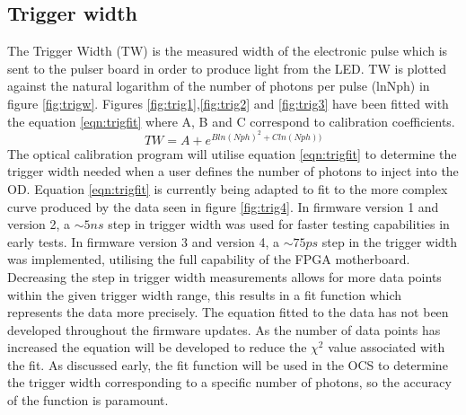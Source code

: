 \subsection{Trigger width}\label{subsec:trigw}
The Trigger Width (TW) is the measured width of the electronic pulse which is sent to the pulser board in order to produce light from the LED. TW is plotted against the natural logarithm of the number of photons per pulse (lnNph) in figure \ref{fig:trigw}. Figures \ref{fig:trig1},\ref{fig:trig2} and \ref{fig:trig3} have been fitted with the equation \ref{eqn:trigfit} where A, B and C correspond to calibration coefficients.  
\begin{equation}
    TW = A + e^{Bln(Nph)^2 + Cln(Nph))}
\label{eqn:trigfit}
\end{equation}
The optical calibration program will utilise equation \ref{eqn:trigfit} to determine the trigger width needed when a user defines the number of photons to inject into the OD. Equation \ref{eqn:trigfit} is currently being adapted to fit to the more complex curve produced by the data seen in figure \ref{fig:trig4}. In firmware version 1 and version 2, a $\sim5ns$ step in trigger width was used for faster testing capabilities in early tests. In firmware version 3 and version 4, a $\sim75ps$ step in the trigger width was implemented, utilising the full capability of the FPGA motherboard. Decreasing the step in trigger width measurements allows for more data points within the given trigger width range, this results in a fit function which represents the data more precisely. 
\newline
The equation fitted to the data has not been developed throughout the firmware updates. As the number of data points has increased the equation will be developed to reduce the $\chi^2$ value associated with the fit. 
\newline
As discussed early, the fit function will be used in the OCS to determine the trigger width corresponding to a specific number of photons, so the accuracy of the function is paramount. 

